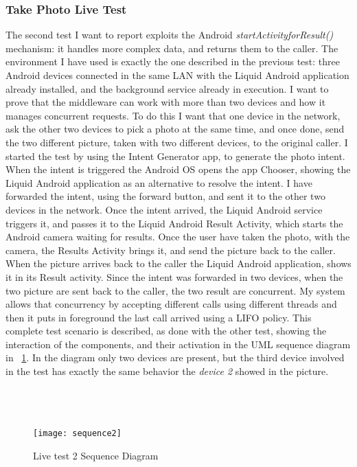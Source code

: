 \subsubsection{Take Photo Live Test}
The second test I want to report exploits the Android \textit{startActivityforResult()} mechanism: it handles more complex data, and returns them to the caller. The environment I have used is exactly the one described in the previous test: three Android devices connected in the same LAN with the Liquid Android application already installed, and the background service already in execution. I want to prove that the middleware can work with more than two devices and how it manages concurrent requests. To do this I want that one device in the network, ask the other two devices to pick a photo at the same time, and once done, send the two different picture, taken with two different devices, to the original caller. I started the test by using the Intent Generator app, to generate the photo intent. When the intent is triggered the Android OS opens the app Chooser, showing the Liquid Android application as an alternative to resolve the intent. I have forwarded the intent, using the forward button, and sent it to the other two devices in the network. Once the intent arrived, the Liquid Android service triggers it, and passes it to the Liquid Android Result Activity, which starts the Android camera waiting for results. Once the user have taken the photo, with the camera, the Results Activity brings it, and send the picture back to the caller. When the picture arrives back to the caller the Liquid Android application, shows it in its Result activity. Since the intent was forwarded in two devices, when the two picture are sent back to the caller, the two result are concurrent. My system allows that concurrency by accepting different calls using different threads and then it puts in foreground the last call arrived using a LIFO policy. This complete test scenario is described, as done with the other test, showing the interaction of the components, and their activation in the UML sequence diagram in \figurename~\ref{fig:5.8}. In the diagram only two devices are present, but the third device involved in the test has exactly the same behavior the \textit{device 2} showed in the picture.\\\\\\\\
\begin{figure}[h]
	\centering
	\texttt{[image: sequence2]}
	\caption{Live test 2 Sequence Diagram}
	\label{fig:5.8}
\end{figure}\\
